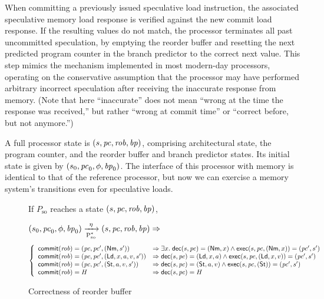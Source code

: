 When committing a
previously issued speculative load instruction, the associated speculative
memory load response is verified against the new commit load response. If the
resulting values do not match, the processor terminates all past uncommitted
speculation, by emptying the reorder buffer and resetting the
next predicted program counter in the branch predictor to the correct next value. This step mimics
the mechanism implemented in most modern-day processors, operating on the
conservative assumption that the processor may have performed arbitrary
incorrect speculation after receiving the inaccurate response from
memory.  (Note that here ``inaccurate'' does not mean ``wrong at
the time the response was received,'' but rather ``wrong at commit
time'' or ``correct before, but not anymore.'')

A full processor state is $(s, \pc, \rob, \ppc)$, comprising
architectural state, the program counter, and the reorder buffer and branch
predictor states. Its initial state is given by $(s_0, \pc_0, \phi, \ppc_0)$.
The interface of this processor with memory is identical
to that of the reference processor, but now we can exercise a memory
system's transitions even for speculative loads.

\begin{figure*}[t]
\begin{inv}
If $P_\text{so}$ reaches a state $(s, \pc, \rob, \ppc)$, \ie{}

$\io{P$_\text{so}^{*}$}{s_0,\pc_0,\phi,\ppc_0}{s,\pc,\rob,\ppc}{\eta} \Rightarrow$
\begin{displaymath}
\left\{
\begin{array}{ll}
\commit(\rob) = (\pc, \pc', (\nm, s')) &\Rightarrow
\exists x. \; \dec(s,\pc) = (\nm, x) \wedge \exec(s,\pc, (\nm,x)) =
(\pc', s')\\
\commit(\rob) = (\pc, \pc', (\ld, x, a, v, s')) & \Rightarrow
\dec(s,\pc) = (\ld, x,a) \wedge \exec(s,\pc, (\ld,x,v)) = (\pc', s')\\
\commit(\rob) = (\pc, \pc', (\st, a, v, s')) &\Rightarrow
\dec(s,\pc) = (\st, a,v) \wedge \exec(s,\pc, (\st)) =
(\pc', s')\\
\commit(\rob) = H & \Rightarrow
\dec(s, \pc) = H\\
\end{array}
\right.\end{displaymath}
\label{rob}
\end{inv}
\vspace{-.5cm}
\caption{Correctness of reorder buffer}
\label{robfig}
\end{figure*}

